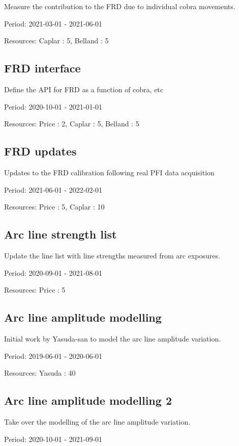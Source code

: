 Measure the contribution to the FRD due to individual cobra movements.

Period: 2021-03-01 - 2021-06-01

Resources: Caplar : 5, Belland : 5

\subsection{FRD interface}

Define the API for FRD as a function of cobra, etc

Period: 2020-10-01 - 2021-01-01

Resources: Price : 2, Caplar : 5, Belland : 5

\subsection{FRD updates}

Updates to the FRD calibration following real PFI data acquisition

Period: 2021-06-01 - 2022-02-01

Resources: Price : 5, Caplar : 10

\subsection{Arc line strength list}

Update the line list with line strengths measured from arc exposures.

Period: 2020-09-01 - 2021-08-01

Resources: Price : 5

\subsection{Arc line amplitude modelling}

Initial work by Yasuda-san to model the arc line amplitude variation.

Period: 2019-06-01 - 2020-06-01

Resources: Yasuda : 40

\subsection{Arc line amplitude modelling 2}

Take over the modelling of the arc line amplitude variation.

Period: 2020-10-01 - 2021-09-01

